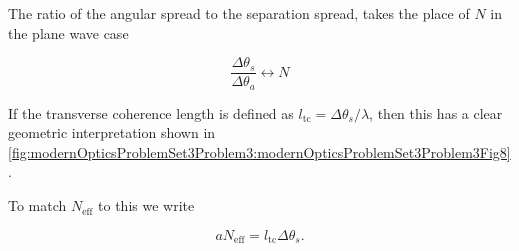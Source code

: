 {The ratio of the angular spread to the separation spread, takes the place of $N$ in the plane wave case

\begin{dmath}\label{eqn:modernOptics:problemSet3:3:980}
\frac{\Delta \theta_s }{\Delta \theta_a} \leftrightarrow N
\end{dmath}


%
%

If the transverse coherence length is defined as $l_{\mathrm{tc}} = \Delta \theta_s/\lambda$, then this has a clear geometric interpretation shown in \cref{fig:modernOpticsProblemSet3Problem3:modernOpticsProblemSet3Problem3Fig8}.


To match $N_{\mathrm{eff}}$ to this we write

\begin{dmath}\label{eqn:modernOptics:problemSet3:3:1000}
a N_{\mathrm{eff}} = l_{\mathrm{tc}} \Delta \theta_s.
\end{dmath}

}
